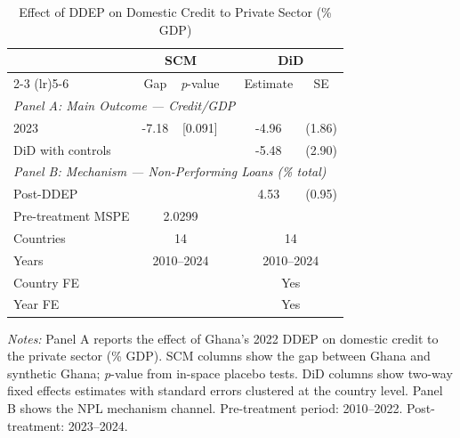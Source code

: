 \begin{table}[t]
\centering
\caption{Effect of DDEP on Domestic Credit to Private Sector (\% GDP)}
\label{tab:main_results}
\begin{tabular}{lccccc}
\toprule
 & \multicolumn{2}{c}{SCM} & & \multicolumn{2}{c}{DiD} \\
\cmidrule(lr){2-3} \cmidrule(lr){5-6}
 & Gap & \textit{p}-value & & Estimate & SE \\
\midrule
\multicolumn{6}{l}{\textit{Panel A: Main Outcome --- Credit/GDP}} \\
2023 & -7.18 & [0.091] & & -4.96 & (1.86) \\
\midrule
DiD with controls & & & & -5.48 & (2.90) \\
\midrule
\multicolumn{6}{l}{\textit{Panel B: Mechanism --- Non-Performing Loans (\% total)}} \\
Post-DDEP & & & & 4.53 & (0.95) \\
\midrule
Pre-treatment MSPE & \multicolumn{2}{c}{2.0299} & & & \\
Countries & \multicolumn{2}{c}{14} & & \multicolumn{2}{c}{14} \\
Years & \multicolumn{2}{c}{2010--2024} & & \multicolumn{2}{c}{2010--2024} \\
Country FE & & & & \multicolumn{2}{c}{Yes} \\
Year FE & & & & \multicolumn{2}{c}{Yes} \\
\bottomrule
\end{tabular}
\begin{tablenotes}[flushleft]
\small
\item \textit{Notes:} Panel A reports the effect of Ghana's 2022 DDEP on domestic credit to the private sector (\% GDP). SCM columns show the gap between Ghana and synthetic Ghana; \textit{p}-value from in-space placebo tests. DiD columns show two-way fixed effects estimates with standard errors clustered at the country level. Panel B shows the NPL mechanism channel. Pre-treatment period: 2010--2022. Post-treatment: 2023--2024.
\end{tablenotes}
\end{table}
